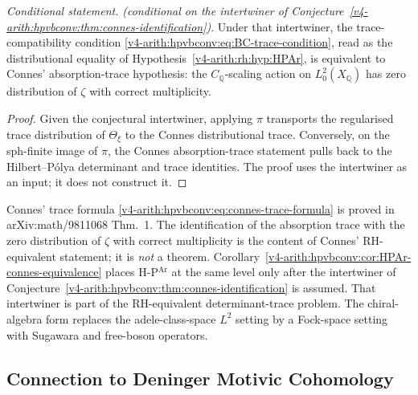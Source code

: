 \begin{corollary}
\label{v4-arith:hpvbconv:cor:HPAr-connes-equivalence}
\emph{Conditional statement.} \emph{(conditional on the intertwiner of
Conjecture~\ref{v4-arith:hpvbconv:thm:connes-identification})}. Under that
intertwiner, the trace-compatibility condition
\eqref{v4-arith:hpvbconv:eq:BC-trace-condition}, read as the
distributional equality of Hypothesis~\ref{v4-arith:rh:hyp:HPAr}, is equivalent
to Connes' absorption-trace hypothesis: the
\(C_{\mathbb{Q}}\)-scaling action on \(L^{2}_{0}(X_{\mathbb{Q}})\) has
zero distribution of \(\zeta\) with correct multiplicity.
\end{corollary}

\begin{proof}
Given the conjectural intertwiner, applying \(\pi\) transports the
regularised trace distribution of \(\Theta_{\xi}\) to the Connes
distributional trace. Conversely, on the sph-finite image of \(\pi\),
the Connes absorption-trace statement pulls back to the
Hilbert--P\'olya determinant and trace identities. The proof uses the
intertwiner as an input; it does not construct it.
\end{proof}

\begin{remark}
\label{v4-arith:hpvbconv:rem:connes-form}
Connes' trace formula \eqref{v4-arith:hpvbconv:eq:connes-trace-formula}
is proved in arXiv:math/9811068 Thm.~1. The identification of the
absorption trace with the zero distribution of \(\zeta\) with correct
multiplicity is the content of Connes' RH-equivalent statement; it is
\emph{not} a theorem. Corollary~\ref{v4-arith:hpvbconv:cor:HPAr-connes-equivalence}
places H-P\(^{\mathrm{Ar}}\) at the same level only after the
intertwiner of Conjecture~\ref{v4-arith:hpvbconv:thm:connes-identification} is
assumed. That intertwiner is part of the RH-equivalent
determinant-trace problem. The chiral-algebra form replaces the
adele-class-space \(L^{2}\) setting by a Fock-space setting with
Sugawara and free-boson operators.
\end{remark}

\subsection{Connection to Deninger Motivic Cohomology}
\label{v4-arith:hpvbconv:deninger-connection}

